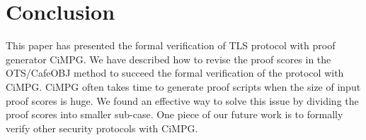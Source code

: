 \documentclass[a4paper,fleqn]{cas-dc}
\begin{document}
\section{Conclusion}\label{conclusion}
This paper has presented the formal verification of TLS protocol with proof generator CiMPG. We have described how to revise the proof scores in the OTS/CafeOBJ method to succeed the formal verification of the protocol with CiMPG. CiMPG often takes time to generate proof scripts when the size of input
proof scores is huge. We found an effective way to solve this issue by dividing the proof scores into smaller sub-case. One piece of our future
work is to formally verify other security protocols with CiMPG.











\end{document}
